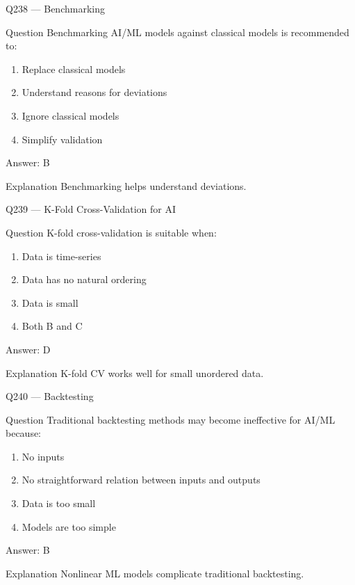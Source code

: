 \documentclass[aspectratio=169,8pt]{beamer}
\begin{document}
\begin{frame}{Q238 --- Benchmarking}
\begin{block}{Question}
Benchmarking AI/ML models against classical models is recommended to:
\begin{enumerate}
\item Replace classical models
\item Understand reasons for deviations
\item Ignore classical models
\item Simplify validation
\end{enumerate}
\end{block}
\begin{exampleblock}{Answer: B}\end{exampleblock}
\begin{block}{Explanation}
Benchmarking helps understand deviations.
\end{block}
\end{frame}

\begin{frame}{Q239 --- K-Fold Cross-Validation for AI}
\begin{block}{Question}
K-fold cross-validation is suitable when:
\begin{enumerate}
\item Data is time-series
\item Data has no natural ordering
\item Data is small
\item Both B and C
\end{enumerate}
\end{block}
\begin{exampleblock}{Answer: D}\end{exampleblock}
\begin{block}{Explanation}
K-fold CV works well for small unordered data.
\end{block}
\end{frame}

\begin{frame}{Q240 --- Backtesting}
\begin{block}{Question}
Traditional backtesting methods may become ineffective for AI/ML because:
\begin{enumerate}
\item No inputs
\item No straightforward relation between inputs and outputs
\item Data is too small
\item Models are too simple
\end{enumerate}
\end{block}
\begin{exampleblock}{Answer: B}\end{exampleblock}
\begin{block}{Explanation}
Nonlinear ML models complicate traditional backtesting.
\end{block}
\end{frame}
\end{document}

